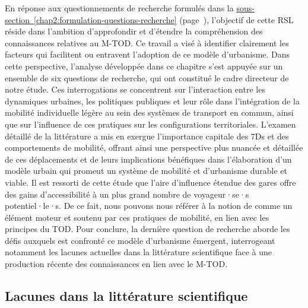 \begin{refsegment}
En réponse aux questionnements de recherche formulés dans la \hyperref[chap2:formulation-questions-recherche]{sous-section~\ref{chap2:formulation-questions-recherche}} (page~\pageref{chap2:formulation-questions-recherche}), l'objectif de cette \acrshort{RSL} réside dans l'ambition d'approfondir et d'étendre la compréhension des connaissances relatives au \acrshort{M-TOD}. Ce travail a visé à identifier clairement les facteurs qui facilitent ou entravent l'adoption de ce modèle d'urbanisme. Dans cette perspective, l'analyse développée dans ce chapitre s'est appuyée sur un ensemble de six questions de recherche, qui ont constitué le cadre directeur de notre étude. Ces interrogations se concentrent sur l'interaction entre les dynamiques urbaines, les politiques publiques et leur rôle dans l'intégration de la mobilité individuelle légère au sein des systèmes de transport en commun, ainsi que sur l'influence de ces pratiques sur les configurations territoriales. L'examen détaillé de la littérature a mis en exergue l'importance capitale des \acrshort{7Ds} et des comportements de mobilité, offrant ainsi une perspective plus nuancée et détaillée de ces déplacements et de leurs implications bénéfiques dans l'élaboration d'un modèle urbain qui promeut un système de mobilité et d'urbanisme \gls{durable} et viable. Il est ressorti de cette étude que l'aire d'influence étendue des gares offre des gains d'accessibilité à un plus grand nombre de voyageur·se·s potentiel·le·s. De ce fait, nous pouvons nous référer à la notion de  \textcolor{blue}{\autocite[86]{kaufmann_retour_2014}} comme un élément moteur et soutenu par ces pratiques de mobilité, en lien avec les principes du \acrshort{TOD}. Pour conclure, la dernière question de recherche aborde les défis auxquels est confronté ce modèle d'urbanisme émergent, interrogeant notamment les lacunes actuelles dans la littérature scientifique face à une production récente des connaissances en lien avec le \acrshort{M-TOD}.%

\subsection*{Lacunes dans la littérature scientifique
    \label{chap2:literature-gap}
    }


\end{refsegment}
